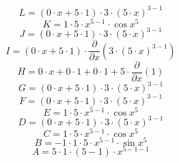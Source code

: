 \documentclass[12pt]{article}
\begin{document}
\begin{equation}
	L = 
\left( 0\cdot x + 5\cdot 1\right) \cdot 3\cdot \left( 5\cdot x\right) ^{3 - 1}
\end{equation}
\begin{equation}
	K = 
1\cdot 5\cdot x^{5 - 1}\cdot \cos {x^{5}}
\end{equation}
\begin{equation}
	J = 
\left( 0\cdot x + 5\cdot 1\right) \cdot 3\cdot \left( 5\cdot x\right) ^{3 - 1}
\end{equation}
\begin{equation}
	I = 
\left( 0\cdot x + 5\cdot 1\right) \cdot \frac{\partial}{\partial x}\left( 3\cdot \left( 5\cdot x\right) ^{3 - 1}\right) 
\end{equation}
\begin{equation}
	H = 
0\cdot x + 0\cdot 1 + 0\cdot 1 + 5\cdot \frac{\partial}{\partial x}\left( 1\right) 
\end{equation}
\begin{equation}
	G = 
\left( 0\cdot x + 5\cdot 1\right) \cdot 3\cdot \left( 5\cdot x\right) ^{3 - 1}
\end{equation}
\begin{equation}
	F = 
\left( 0\cdot x + 5\cdot 1\right) \cdot 3\cdot \left( 5\cdot x\right) ^{3 - 1}
\end{equation}
\begin{equation}
	E = 
1\cdot 5\cdot x^{5 - 1}\cdot \cos {x^{5}}
\end{equation}
\begin{equation}
	D = 
\left( 0\cdot x + 5\cdot 1\right) \cdot 3\cdot \left( 5\cdot x\right) ^{3 - 1}
\end{equation}
\begin{equation}
	C = 
1\cdot 5\cdot x^{5 - 1}\cdot \cos {x^{5}}
\end{equation}
\begin{equation}
	B = 
-1\cdot 1\cdot 5\cdot x^{5 - 1}\cdot \sin {x^{5}}
\end{equation}
\begin{equation}
	A = 
5\cdot 1\cdot \left( 5 - 1\right) \cdot x^{5 - 1 - 1}
\end{equation}
\end{document}
